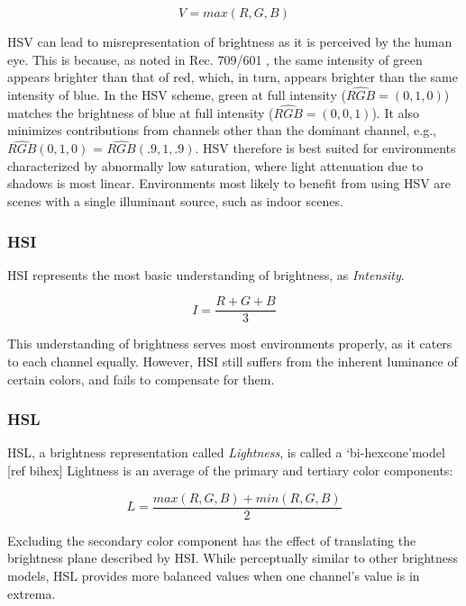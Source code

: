 \begin{equation}
V = max(R, G, B)
\label{eqn:hsv}
\end{equation}

HSV can lead to misrepresentation of brightness as it is perceived by the human eye. This is because, as noted in Rec. 709/601 \cite{bt709, bt601}, the same intensity of green appears brighter than that of red, which, in turn, appears brighter than the same intensity of blue. In the HSV scheme, green at full intensity ($\hat{RGB} = (0, 1, 0)$) matches the brightness of blue at full intensity ($\hat{RGB} = (0, 0, 1)$). It also minimizes contributions from channels other than the dominant channel, e.g., $\hat{RGB}(0, 1, 0)$ = $\hat{RGB}(.9, 1, .9)$. HSV therefore is best suited for environments characterized by abnormally low saturation, where light attenuation due to shadows is most linear. Environments most likely to benefit from using HSV are scenes with a single illuminant source, such as indoor scenes.

\subsubsection{HSI}

HSI represents the most basic understanding of brightness, as \textit{Intensity}. 

\begin{equation}
I = \dfrac{R + G + B}{3}
\end{equation}

This understanding of brightness serves most environments properly, as it caters to each channel equally. However, HSI still suffers from the inherent luminance of certain colors, and fails to compensate for them.

\subsubsection{HSL}

HSL, a brightness representation called \textit{Lightness}, is called a \lq{bi-hexcone}\rq model [ref bihex] Lightness is an average of the primary and tertiary color components:

\begin{equation}
L = \dfrac{max(R,G,B) + min(R,G,B)}{2}
\end{equation}

Excluding the secondary color component has the effect of translating the brightness plane described by HSI. While perceptually similar to other brightness models, HSL provides more balanced values when one channel's value is in extrema.

